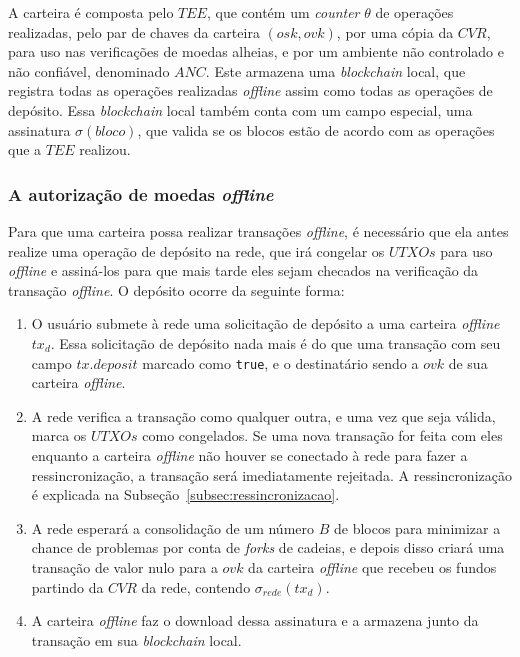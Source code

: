 \documentclass[
  12pt,
  a4paper,
  oneside,
  article,
]{abntex2}
\begin{document}
A carteira é composta pelo $TEE$, que contém um \textit{counter} $\theta$ de operações realizadas, pelo par de chaves da carteira $(osk, ovk)$, por uma cópia da $CVR$, para uso nas verificações de moedas alheias, e por um ambiente não controlado e não confiável, denominado $ANC$. Este armazena uma \textit{blockchain} local, que registra todas as operações realizadas \textit{offline} assim como todas as operações de depósito. Essa \textit{blockchain} local também conta com um campo especial, uma assinatura $\sigma(bloco)$, que valida se os blocos estão de acordo com as operações que a $TEE$ realizou.

\subsubsection{A autorização de moedas \textit{offline}}
Para que uma carteira possa realizar transações \textit{offline}, é necessário que ela antes realize uma operação de depósito na rede, que irá congelar os $UTXOs$ para uso \textit{offline} e assiná-los para que mais tarde eles sejam checados na verificação da transação \textit{offline}. O depósito ocorre da seguinte forma:

\begin{enumerate}
	\item O usuário submete à rede uma solicitação de depósito a uma carteira \textit{offline} $tx_d$. Essa solicitação de depósito nada mais é do que uma transação com seu campo $tx.deposit$ marcado como \texttt{true}, e o destinatário sendo a $ovk$ de sua carteira \textit{offline}.
	\item A rede verifica a transação como qualquer outra, e uma vez que seja válida, marca os $UTXOs$ como congelados. Se uma nova transação for feita com eles enquanto a carteira \textit{offline} não houver se conectado à rede para fazer a ressincronização, a transação será imediatamente rejeitada. A ressincronização é explicada na Subseção~\ref{subsec:ressincronizacao}.
	\item A rede esperará a consolidação de um número $B$ de blocos para minimizar a chance de problemas por conta de \textit{\textit{forks}} de cadeias, e depois disso criará uma transação de valor nulo para a $ovk$ da carteira \textit{offline} que recebeu os fundos partindo da $CVR$ da rede, contendo $\sigma_{rede}(tx_d)$.
	\item A carteira \textit{offline} faz o download dessa assinatura e a armazena junto da transação em sua \textit{blockchain} local.
\end{enumerate}
\end{document}
